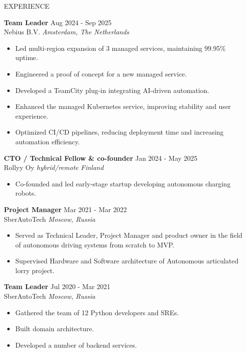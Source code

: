 \documentclass{resume} %
\begin{document}
\begin{rSection}{EXPERIENCE}

\textbf{Team Leader} \hfill Aug 2024 - Sep 2025\\
Nebius B.V. \hfill \textit{Amsterdam, The Netherlands}
\begin{itemize}
	\itemsep -3pt {}
	\item Led multi-region expansion of 3 managed services, maintaining 99.95\% uptime.
	\item Engineered a proof of concept for a new managed service.
	\item Developed a TeamCity plug-in integrating AI-driven automation.
	\item Enhanced the managed Kubernetes service, improving stability and user experience.
	\item Optimized CI/CD pipelines, reducing deployment time and increasing automation efficiency.
\end{itemize}

\textbf{CTO / Technical Fellow \& co-founder} \hfill Jan 2024 - May 2025\\
Rollyy Oy \hfill \textit{hybrid/remote Finland}
\begin{itemize}
	\item Co-founded and led early-stage startup developing autonomous charging robots.
\end{itemize}

\textbf{Project Manager} \hfill Mar 2021 - Mar 2022\\
SberAutoTech \hfill \textit{Moscow, Russia}
\begin{itemize}
   \itemsep -3pt {}
   \item Served as Technical Leader, Project Manager and product owner in the field of autonomous driving systems from scratch to MVP.
   \item Supervised Hardware and Software architecture of Autonomous articulated lorry project.

\end{itemize}

\textbf{Team Leader} \hfill Jul 2020 - Mar 2021\\
SberAutoTech \hfill \textit{Moscow, Russia}
\begin{itemize}
   \itemsep -3pt {}
   \item Gathered the team of 12 Python developers and SREs.
   \item Built domain architecture.
   \item Developed a number of backend services.
\end{itemize}


\end{rSection}
\end{document}
